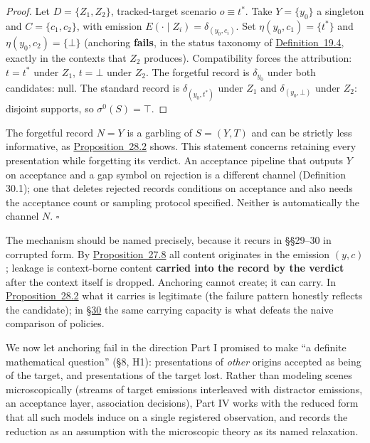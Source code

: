 \begin{proof}

Let \(D = \{Z_1, Z_2\}\), tracked-target scenario \(o \equiv t^*\). Take \(Y = \{y_0\}\) a singleton and \(C = \{c_1, c_2\}\), with emission \(E(\cdot \mid Z_i) = \delta_{(y_0, c_i)}\). Set \(\eta(y_0, c_1) = \{t^*\}\) and \(\eta(y_0, c_2) = \{\bot\}\) (anchoring \textbf{fails}, in the status taxonomy of \hyperlink{stmt:19.4}{Definition~19.4}, exactly in the contexts that \(Z_2\) produces). Compatibility forces the attribution: \(t = t^*\) under \(Z_1\), \(t = \bot\) under \(Z_2\). The forgetful record is \(\delta_{y_0}\) under both candidates: null. The standard record is \(\delta_{(y_0, t^*)}\) under \(Z_1\) and \(\delta_{(y_0, \bot)}\) under \(Z_2\): disjoint supports, so \(\sigma^0(S) = \top\).
\end{proof}

\begin{thmplain}

The forgetful record \(N=Y\) is a garbling of \(S=(Y,T)\) and can be strictly less informative, as \hyperlink{stmt:28.2}{Proposition~28.2} shows. This statement concerns retaining every presentation while forgetting its verdict. An acceptance pipeline that outputs \(Y\) on acceptance and a gap symbol on rejection is a different channel (Definition 30.1); one that deletes rejected records conditions on acceptance and also needs the acceptance count or sampling protocol specified. Neither is automatically the channel \(N\). \(\square\)
\end{thmplain}

The mechanism should be named precisely, because it recurs in §§29--30 in corrupted form. By \hyperlink{stmt:27.8}{Proposition~27.8} all content originates in the emission \((y, c)\); leakage is context-borne content \textbf{carried into the record by the verdict} after the context itself is dropped. Anchoring cannot create; it can carry. In \hyperlink{stmt:28.2}{Proposition~28.2} what it carries is legitimate (the failure pattern honestly reflects the candidate); in \hyperlink{sec:30}{§30} the same carrying capacity is what defeats the naive comparison of policies.



We now let anchoring fail in the direction Part I promised to make ``a definite mathematical question'' (§8, H1): presentations of \emph{other} origins accepted as being of the target, and presentations of the target lost. Rather than modeling scenes microscopically (streams of target emissions interleaved with distractor emissions, an acceptance layer, association decisions), Part IV works with the reduced form that all such models induce on a single registered observation, and records the reduction as an assumption with the microscopic theory as its named relaxation.


